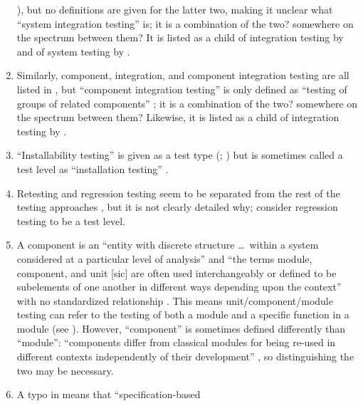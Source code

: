 \begin{enumerate}
            \citeyear[p.~6]{IEEE2021}), but no
            definitions are given for the latter two, making it unclear what
            ``system integration testing'' is; it is a combination of the two?
            somewhere on the spectrum between them? It is listed as a child
            of integration testing by \citetISTQB{} and of system testing
            by \citet[p.~23]{Firesmith2015}.
      \item Similarly, component, integration, and component integration
            testing are all listed in \citep{IEEE2017}, but ``component
            integration testing'' is only defined as ``testing of groups of
            related components'' \citep[p.~82]{IEEE2017}; it is a combination of
            the two? somewhere on the spectrum between them? Likewise, it is
            listed as a child of integration testing by \citetISTQB{}.
      \item ``Installability testing'' is given as a test type
            (\citealp[p.~22]{IEEE2022}; \citeyear[p.~38]{IEEE2021})
            but is sometimes called a test level as
            ``installation testing'' \citep[p.~445]{PetersAndPedrycz2000}.
      \item Retesting and regression testing seem to be separated from the rest
            of the testing approaches \citep[p.~23]{IEEE2022}, but it is not
            clearly detailed why; \citet[p.~3]{BarbosaEtAl2006} consider
            regression testing to be a test level.
      \item A component is an ``entity with discrete structure \dots\ within a
            system considered at a particular level of analysis''
            \citep{ISO_IEC2023b} and ``the terms module, component, and unit
                  [sic] are often used interchangeably or defined to be subelements
            of one another in different ways depending upon the context'' with
            no standardized relationship \citep[p.~82]{IEEE2017}. This means
            unit/component/module testing can refer to the testing of both a
            module and a specific function in a module (see ).
            However, ``component'' is sometimes defined differently than
            ``module'': ``components differ from classical modules for being
            re-used in different contexts independently of their development''
            \citep[p.~107]{BaresiAndPezzè2006}, so distinguishing the two
            may be necessary.
      \item A typo in \citep[Fig.~2]{IEEE2021} means that ``specification-based

\end{enumerate}
